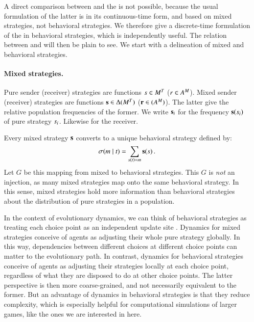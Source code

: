 A direct comparison between \rdd and the \rmd is not possible, because
the usual formulation of the latter is in its continuous-time form,
and based on mixed strategies, not behavioral strategies. We therefore
give a discrete-time formulation of the \rmd in behavioral strategies,
which is independently useful. The relation between \rdd and \rmd will
then be plain to see. We start with a delineation of mixed and
behavioral strategies.

\paragraph{Mixed strategies.} Pure sender (receiver) strategies are
functions $s \in M^T$ ($r \in
A^M$). Mixed sender (receiver) strategies are functions
$\mathrm{\mathbf{s}} \in \Delta(M^T)$ ($\mathrm{\mathbf{r}} \in
(A^M)$). The latter give the relative population frequencies
of the former. We write $\mathrm{\mathbf{s}}_i$ for the frequency
$\mathrm{\mathbf{s}}(s_i)$ of pure strategy $s_i$. Likewise for the
receiver.

Every mixed strategy $\mathrm{\mathbf{s}}$ converts to a unique behavioral strategy defined by:
\begin{align*}
  \sigma(m \mid t) = \sum_{s(t) = m} \mathrm{\mathbf{s}}(s)\,.
\end{align*} 
Let $G$ be this mapping from mixed to behavioral strategies. This $G$
is \emph{not} an injection, as many mixed strategies map onto the same
behavioral strategy. In this sense, mixed strategies hold more
information than behavioral strategies about the distribution of pure strategies in a population.

In the context of evolutionary dynamics, we can think of behavioral
strategies as treating each choice point as an independent update site
\citep[e.g.][]{Cressman2003:Evolutionary-Dy,Sandholm2013:Population-Game}. Dynamics
for mixed strategies conceive of agents as adjusting their whole pure
strategy globally. In this way, dependencies between different choices
at different choice points can matter to the evolutionary path. In
contrast, dynamics for behavioral strategies conceive of agents as
adjusting their strategies locally at each choice point, regardless of
what they are disposed to do at other choice points. The latter
perspective is then more coarse-grained, and not necessarily
equivalent to the former. But an advantage of dynamics in behavioral
strategies is that they reduce complexity, which is especially helpful
for computational simulations of larger games, like the ones we are
interested in here.

